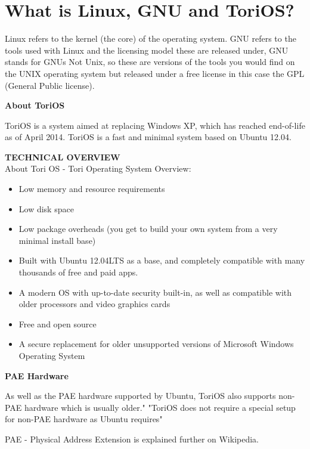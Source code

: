 \documentclass[12pt,a4paper]{book}
\begin{document}
\chapter{What is Linux, GNU and ToriOS?}

Linux refers to the kernel (the core) of the operating system.  GNU refers to the tools used with Linux and the licensing model these are released under,  GNU stands for GNUs Not Unix,  so these are versions of the tools you would find on the UNIX operating system but released under a free license in this case the GPL (General Public license).

\textbf{About ToriOS}

ToriOS \cite{ToriOS} is a system aimed at replacing Windows XP, which has reached end-of-life as of April 2014. ToriOS is a fast and minimal system based on Ubuntu 12.04. 

\textbf{TECHNICAL OVERVIEW} \\
About Tori OS - Tori Operating System Overview:

\begin{itemize}
\item{Low memory and resource requirements}
\item{Low disk space}
\item{Low package overheads (you get to build your own system from a very minimal install base)}
\item{Built with Ubuntu 12.04LTS as a base, and completely compatible with many thousands of free and paid apps.}
\item{ A modern OS with up-to-date security built-in, as well as compatible with older processors and video graphics cards}
\item{Free and open source}
\item{A secure replacement for older unsupported versions of Microsoft Windows Operating System} 
\end{itemize}

\textbf{PAE Hardware}

As well as the PAE hardware supported by Ubuntu, ToriOS also supports non-PAE hardware which is usually older." "ToriOS does not require a special setup for non-PAE hardware as Ubuntu requires" \cite{PAE2}


PAE - Physical Address Extension is explained further on Wikipedia. \cite{PAE} \\
\end{document}
